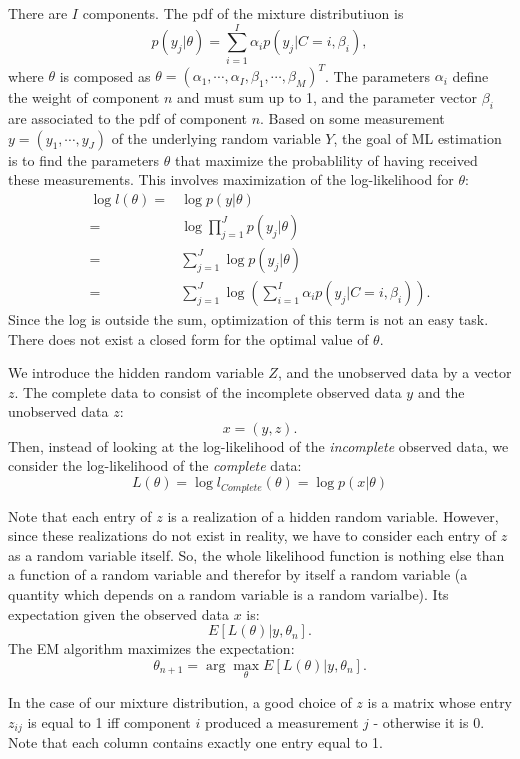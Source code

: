 \documentclass{article}  %
\begin{document}
There are $I$ components. The pdf of the mixture distributiuon is 
\begin{equation}
p(y_j|\theta) = \sum_{i=1}^I \alpha_i p(y_j|C=i,\beta_i),
\end{equation}
where $\theta$ is composed as $\theta=(\alpha_1,\cdots,\alpha_I,
\beta_1,\cdots,\beta_M)^T$. The parameters $\alpha_i$ define the weight of
component $n$ and must sum up to 1, and the parameter vector $\beta_i$ are
associated to the pdf of component $n$.
Based on some measurement $y=(y_1,\cdots,y_J)$ of the underlying random variable
$Y$, the goal of ML estimation is to find the parameters $\theta$ that maximize
the probablility of having received these measurements. This involves
maximization of the log-likelihood for $\theta$:
\begin{align*}
\log l(\theta) = & \log p(y|\theta)\\
 = & \log \prod_{j=1}^J p(y_j|\theta)\\
 = & \sum_{j=1}^J \log p(y_j|\theta)\\
 = & \sum_{j=1}^J \log \left ( \sum_{i=1}^I \alpha_i p(y_j|C=i,\beta_i) \right).
\end{align*}
Since the log is outside the sum, optimization of this term is not an easy task.
There does not exist a closed form for the optimal value of $\theta$.

We introduce the hidden random variable $Z$, and the unobserved data by a vector
$z$. The complete data to consist of the incomplete observed data $y$ and the
unobserved data $z$: 
\[x=(y, z).\] Then, instead of looking at the log-likelihood of
the \emph{incomplete} observed data, we consider the log-likelihood of the
\emph{complete} data:
\[
L(\theta) = \log l_{Complete}(\theta) = \log p(x|\theta)
\]

Note that each entry of $z$ is a realization of a hidden random variable.
However, since these realizations do not exist in reality, we have to consider
each entry of $z$ as a random variable itself. So, the whole likelihood function
is nothing else than a function of a random variable and therefor by itself a
random variable (a quantity which depends on a random variable is a random
varialbe). Its expectation given the observed data $x$ is:
\[
E [L(\theta)|y,\theta_n].
\]
The EM algorithm maximizes the expectation:
\[
\theta_{n+1} = \arg\max_{\theta} E[L(\theta)|y,\theta_n].
\]

In the case of our mixture distribution, a good choice of $z$ is a matrix whose
entry $z_{ij}$ is equal to 1 iff component $i$ produced a measurement $j$ -
otherwise it is 0. Note that each column contains exactly one entry equal to 1.
\end{document}
